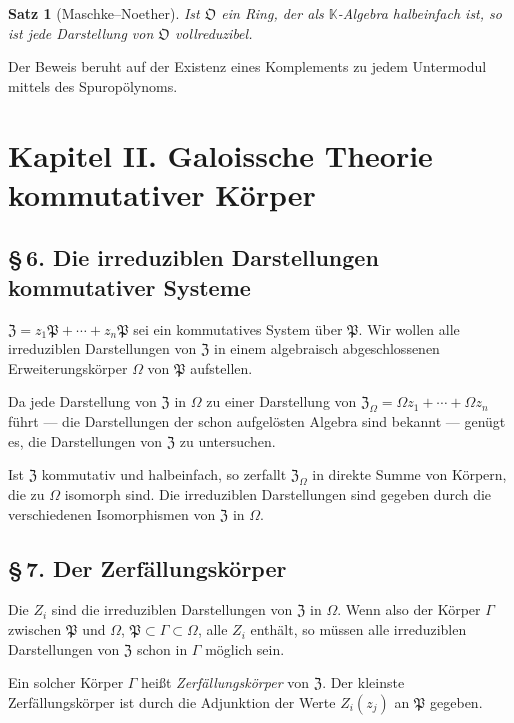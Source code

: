 \documentclass[10pt,a4paper]{article}
\theoremstyle{plain}
\newtheorem{satz}{Satz}[section]
\theoremstyle{definition}
\theoremstyle{remark}
\newcommand{\KK}{\mathbb{K}}
\newcommand{\cO}{\mathfrak{O}}
\begin{document}
\begin{satz}[Maschke--Noether]
Ist $\cO$ ein Ring, der als $\KK$-Algebra halbeinfach ist, so ist jede Darstellung von $\cO$ vollreduzibel.
\end{satz}

Der Beweis beruht auf der Existenz eines Komplements zu jedem Untermodul mittels des Spurop\"olynoms.

\newpage
\section*{Kapitel II. Galoissche Theorie kommutativer K\"orper}

\subsection*{\S\,6. Die irreduziblen Darstellungen kommutativer Systeme}

$\mathfrak{Z} = z_1 \mathfrak{P} + \cdots + z_n \mathfrak{P}$ sei ein kommutatives System \"uber $\mathfrak{P}$. Wir wollen alle irreduziblen Darstellungen von $\mathfrak{Z}$ in einem algebraisch abgeschlossenen Erweiterungsk\"orper $\Omega$ von $\mathfrak{P}$ aufstellen.

Da jede Darstellung von $\mathfrak{Z}$ in $\Omega$ zu einer Darstellung von $\mathfrak{Z}_\Omega = \Omega z_1 + \cdots + \Omega z_n$ f\"uhrt --- die Darstellungen der schon aufgel\"osten Algebra sind bekannt --- gen\"ugt es, die Darstellungen von $\mathfrak{Z}$ zu untersuchen.

Ist $\mathfrak{Z}$ kommutativ und halbeinfach, so zerfallt $\mathfrak{Z}_\Omega$ in direkte Summe von K\"orpern, die zu $\Omega$ isomorph sind. Die irreduziblen Darstellungen sind gegeben durch die verschiedenen Isomorphismen von $\mathfrak{Z}$ in $\Omega$.

\subsection*{\S\,7. Der Zerf\"allungsk\"orper}

Die $Z_i$ sind die irreduziblen Darstellungen von $\mathfrak{Z}$ in $\Omega$. Wenn also der K\"orper $\Gamma$ zwischen $\mathfrak{P}$ und $\Omega$, $\mathfrak{P} \subset \Gamma \subset \Omega$, alle $Z_i$ enth\"alt, so m\"ussen alle irreduziblen Darstellungen von $\mathfrak{Z}$ schon in $\Gamma$ m\"oglich sein.

Ein solcher K\"orper $\Gamma$ hei\ss t \emph{Zerf\"allungsk\"orper} von $\mathfrak{Z}$. Der kleinste Zerf\"allungsk\"orper ist durch die Adjunktion der Werte $Z_i(z_j)$ an $\mathfrak{P}$ gegeben.
\end{document}

